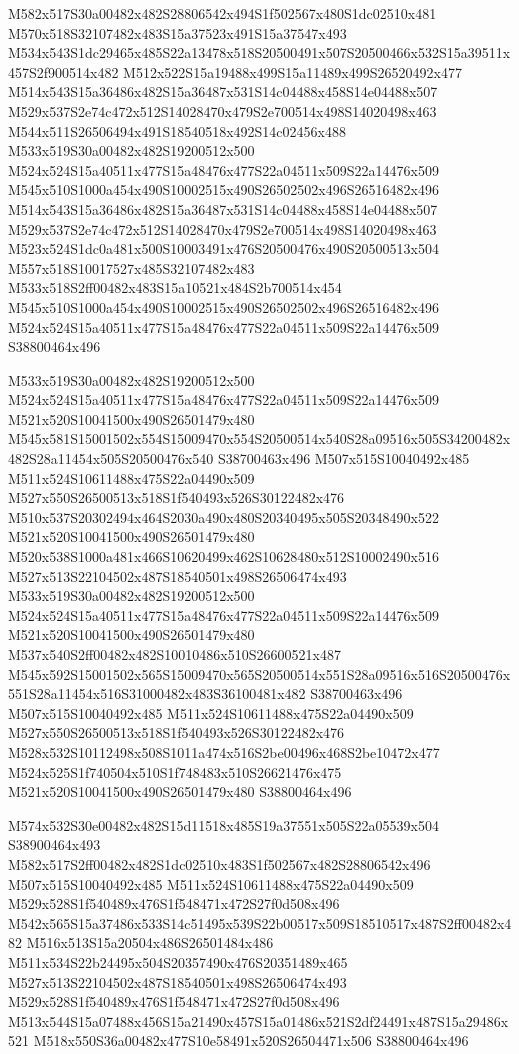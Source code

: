 \documentclass{article}
\begin{document}
\begin{multicols}{2}
M582x517S30a00482x482S28806542x494S1f502567x480S1dc02510x481 M570x518S32107482x483S15a37523x491S15a37547x493 M534x543S1dc29465x485S22a13478x518S20500491x507S20500466x532S15a39511x457S2f900514x482 M512x522S15a19488x499S15a11489x499S26520492x477 M514x543S15a36486x482S15a36487x531S14c04488x458S14e04488x507 M529x537S2e74c472x512S14028470x479S2e700514x498S14020498x463 M544x511S26506494x491S18540518x492S14c02456x488 M533x519S30a00482x482S19200512x500 M524x524S15a40511x477S15a48476x477S22a04511x509S22a14476x509 M545x510S1000a454x490S10002515x490S26502502x496S26516482x496 M514x543S15a36486x482S15a36487x531S14c04488x458S14e04488x507 M529x537S2e74c472x512S14028470x479S2e700514x498S14020498x463 M523x524S1dc0a481x500S10003491x476S20500476x490S20500513x504 M557x518S10017527x485S32107482x483 M533x518S2ff00482x483S15a10521x484S2b700514x454 M545x510S1000a454x490S10002515x490S26502502x496S26516482x496 M524x524S15a40511x477S15a48476x477S22a04511x509S22a14476x509 S38800464x496

M533x519S30a00482x482S19200512x500 M524x524S15a40511x477S15a48476x477S22a04511x509S22a14476x509 M521x520S10041500x490S26501479x480 M545x581S15001502x554S15009470x554S20500514x540S28a09516x505S34200482x482S28a11454x505S20500476x540 S38700463x496 M507x515S10040492x485 M511x524S10611488x475S22a04490x509 M527x550S26500513x518S1f540493x526S30122482x476 M510x537S20302494x464S2030a490x480S20340495x505S20348490x522 M521x520S10041500x490S26501479x480 M520x538S1000a481x466S10620499x462S10628480x512S10002490x516 M527x513S22104502x487S18540501x498S26506474x493 M533x519S30a00482x482S19200512x500 M524x524S15a40511x477S15a48476x477S22a04511x509S22a14476x509 M521x520S10041500x490S26501479x480 M537x540S2ff00482x482S10010486x510S26600521x487 M545x592S15001502x565S15009470x565S20500514x551S28a09516x516S20500476x551S28a11454x516S31000482x483S36100481x482 S38700463x496 M507x515S10040492x485 M511x524S10611488x475S22a04490x509 M527x550S26500513x518S1f540493x526S30122482x476 M528x532S10112498x508S1011a474x516S2be00496x468S2be10472x477 M524x525S1f740504x510S1f748483x510S26621476x475 M521x520S10041500x490S26501479x480 S38800464x496

M574x532S30e00482x482S15d11518x485S19a37551x505S22a05539x504 S38900464x493 M582x517S2ff00482x482S1dc02510x483S1f502567x482S28806542x496 M507x515S10040492x485 M511x524S10611488x475S22a04490x509 M529x528S1f540489x476S1f548471x472S27f0d508x496 M542x565S15a37486x533S14c51495x539S22b00517x509S18510517x487S2ff00482x482 M516x513S15a20504x486S26501484x486 M511x534S22b24495x504S20357490x476S20351489x465 M527x513S22104502x487S18540501x498S26506474x493 M529x528S1f540489x476S1f548471x472S27f0d508x496 M513x544S15a07488x456S15a21490x457S15a01486x521S2df24491x487S15a29486x521 M518x550S36a00482x477S10e58491x520S26504471x506 S38800464x496


\end{multicols}
\end{document}
